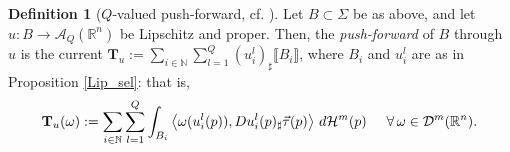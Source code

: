 \documentclass[a4paper,11pt,reqno]{amsart}
\theoremstyle{definition}
\newtheorem{definition}[theorem]{Definition}
\numberwithin{equation}{section}
\numberwithin{subsection}{section}
\newcommand{\N}{\mathbb{N}}
\newcommand{\R}{\mathbb{R}}
\newcommand{\A}{\mathcal{A}}
\newcommand{\D}{\mathcal{D}}
\newcommand{\Ha}{\mathcal{H}}
\begin{document}
\begin{definition}[$Q$-valued push-forward, cf. {\cite[Definition 1.3]{DLS13a}}] \label{Q_pf:def}
Let $B \subset \Sigma$ be as above, and let $u \colon B \to \A_{Q}(\R^n)$ be Lipschitz and proper. Then, the \emph{push-forward} of $B$ through $u$ is the current $\mathbf{T}_{u} := \sum_{i \in \N} \sum_{l=1}^{Q} (u_{i}^{l})_{\sharp}\llbracket B_i \rrbracket$, where $B_i$ and $u_{i}^{l}$ are as in Proposition \ref{Lip_sel}: that is,
\begin{equation} \label{Q_pf:eq}
\mathbf{T}_{u}(\omega) := \sum_{i \in \mathbb{N}} \sum_{l=1}^{Q} \int_{B_i} \left\langle \omega(u_{i}^{l}(p)), Du_{i}^{l}(p)_{\sharp}\vec{\tau}(p) \right\rangle \, d\Ha^m(p) \hspace{0.5cm} \forall \, \omega \in \D^{m}(\R^n).
\end{equation}
\end{definition}
\end{document}

